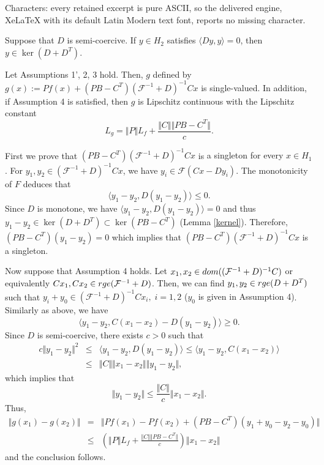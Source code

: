\documentclass[10pt,a4paper]{amsart}
\def\baq{\begin{eqnarray}}
\def\baqn{\begin{eqnarray*}}
\def\eaq{\end{eqnarray}}
\def\eaqn{\end{eqnarray*}}
\newenvironment{proof}{\noindent {\bf Proof} }{\endprf\par}
\begin{document}
Characters: every retained excerpt is pure ASCII, so the delivered engine, XeLaTeX with its default Latin Modern text font, reports no missing character.
    \begin{lemma} \label{kernel}
    Suppose that $D$ is semi-coercive. If $y\in H_2$ satisfies $\langle Dy,y \rangle=0$, then $y\in \ker(D+D^T)$.
       \end{lemma}

 \begin{lemma} \label{glip}
  Let Assumptions 1', 2, 3 hold. {{Then, $g$ defined by $g(x):=Pf(x)+(PB-C^T)(\mathcal{F}^{-1}+D)^{-1}Cx$ is single-valued}}. In addition, if   Assumption 4 is satisfied, then  $g$ is Lipschitz continuous with the Lipschitz constant 
  $$
  L_g=\Vert P \Vert  L_f+\frac{\Vert C \Vert \Vert PB-C^T \Vert}{c}.
  $$
   \end{lemma}    

  \begin{proof}
First we prove that $(PB-C^T)(\mathcal{F}^{-1}+D)^{-1}Cx$ is {{a singleton for every $x\in H_1$. For}} $y_1, y_2 \in (\mathcal{F}^{-1}+D)^{-1}Cx$, we have $y_i\in \mathcal{F}(Cx-Dy_i)$. The monotonicity of $F$ deduces that 
$$\langle y_1-y_2, D(y_1-y_2) \rangle \le 0.$$
 Since $D$ is monotone, we have $\langle y_1-y_2, D(y_1-y_2) \rangle = 0$ and thus $y_1-y_2\in \ker(D+D^T)\subset \ker(PB-C^T)$ (Lemma \ref{kernel}).
 Therefore, $(PB-C^T)(y_1-y_2)=0$ which implies that $(PB-C^T)(\mathcal{F}^{-1}+D)^{-1}Cx$ is {{a singleton}}.

Now suppose that Assumption 4 holds. Let $x_1, x_2 \in {\rm dom}((\mathcal{F}^{-1}+D)^{-1}C)$ or equivalently $Cx_1, Cx_2 \in {\rm rge}({\mathcal{F}}^{-1}+D)$. Then, we can find $y_1, y_2 \in {\rm rge}(D+D^T)$ such that $y_i+y_0 \in (\mathcal{F}^{-1}+D)^{-1}Cx_i,\; i=1, 2$ {{($y_0$ is given in Assumption 4)}}. Similarly as above, we have 
$$
\langle y_1-y_2, C(x_1-x_2) -D(y_1-y_2) \rangle \ge 0.
$$
Since $D$ is semi-coercive, there exists $c>0$ such that 
\baq \nonumber
c\Vert y_1-y_2\Vert^2 &\le& \langle y_1-y_2, D(y_1-y_2) \rangle \le \langle y_1-y_2, C(x_1-x_2) \rangle \\
&\le& \Vert C \Vert \Vert x_1-x_2 \Vert \Vert y_1-y_2 \Vert, \label{semip}
\eaq
which implies that 
$$
\Vert y_1-y_2\Vert \le \frac{\Vert C \Vert}{c} \Vert x_1-x_2 \Vert .
$$
Thus,
\baqn
\Vert g(x_1)-g(x_2)\Vert &=& \Vert Pf(x_1)-Pf(x_2)+(PB-C^T) (y_1+y_0-y_2-y_0)\Vert \\
&\le & (\Vert P \Vert  L_f+\frac{\Vert C \Vert \Vert PB-C^T \Vert}{c}) \Vert x_1-x_2 \Vert
\eaqn
and the conclusion follows. 
 \end{proof}  
\end{document}
